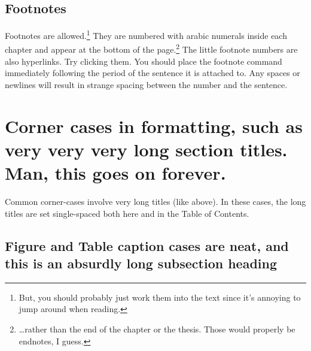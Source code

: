 \subsection{Footnotes}
Footnotes are allowed.\footnote{But, you should probably just work them into
the text since it's annoying to jump around when reading.} They are
numbered with arabic numerals inside each chapter and appear at the bottom
of the page.\footnote{\ldots rather than the end of the chapter or the
thesis.  Those would properly be endnotes, I guess.}  The little footnote
numbers are also hyperlinks.  Try clicking them.  You should place the
footnote command immediately following the period of the sentence it is
attached to.  Any spaces or newlines will result in strange spacing between
the number and the sentence.

\section{Corner cases in formatting, such as very very very long section
titles.  Man, this goes on forever.}

Common corner-cases involve very long titles (like above).  In these cases,
the long titles are set single-spaced both here and in the Table of
Contents.

\subsection{Figure and Table caption cases are neat, and this is an absurdly
long subsection heading}
\label{sec:fig-tab}

